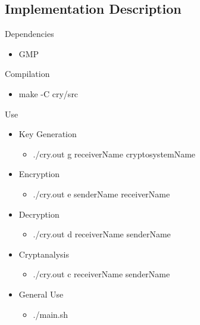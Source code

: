 \subsection{Implementation Description}


Dependencies
\begin{itemize}
  \item GMP
\end{itemize}

Compilation
\begin{itemize}
  \item make -C cry/src
\end{itemize}

Use
\begin{itemize}
  \item Key Generation
  \begin{itemize}
    \item ./cry.out g receiverName cryptosystemName
  \end{itemize}
  \item Encryption
  \begin{itemize}
    \item ./cry.out e senderName receiverName
  \end{itemize}
  \item Decryption
  \begin{itemize}
    \item ./cry.out d receiverName senderName
  \end{itemize}
  \item Cryptanalysis
  \begin{itemize}
    \item ./cry.out c receiverName senderName
  \end{itemize}
  \item General Use
  \begin{itemize}
    \item ./main.sh
  \end{itemize}
\end{itemize}
